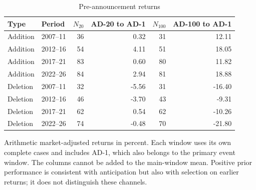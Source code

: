 \begin{table}[!htbp]
\centering
\caption{Pre-announcement returns}\label{tab:anticipation}
\small
\setlength{\tabcolsep}{5pt}
\begin{tabular}{llrrrr}
\toprule
Type & Period & $N_{20}$ & AD-20 to AD-1 & $N_{100}$ & AD-100 to AD-1 \\
\midrule
Addition & 2007--11 & 36 & 0.32 & 31 & 12.11 \\
Addition & 2012--16 & 54 & 4.11 & 51 & 18.05 \\
Addition & 2017--21 & 83 & 0.60 & 80 & 11.82 \\
Addition & 2022--26 & 84 & 2.94 & 81 & 18.88 \\
Deletion & 2007--11 & 32 & -5.56 & 31 & -16.40 \\
Deletion & 2012--16 & 46 & -3.70 & 43 & -9.31 \\
Deletion & 2017--21 & 62 & 0.54 & 62 & -10.26 \\
Deletion & 2022--26 & 74 & -0.48 & 70 & -21.80 \\
\bottomrule
\end{tabular}
\begin{minipage}{\linewidth}\footnotesize\vspace{5pt}
Arithmetic market-adjusted returns in percent. Each window uses its own complete cases and includes AD-1, which also belongs to the primary event window. The columns cannot be added to the main-window mean. Positive prior performance is consistent with anticipation but also with selection on earlier returns; it does not distinguish these channels.
\end{minipage}
\end{table}
